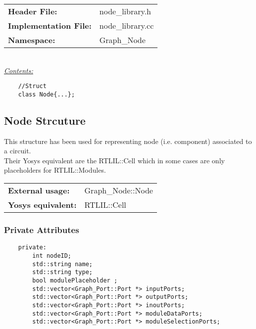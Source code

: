 \documentclass{article}
\begin{document}
\begin{tabular}{ll}
	\textbf{Header File:} & node\_library.h\\
	\textbf{Implementation File:} & node\_library.cc\\
	\textbf{Namespace: } & Graph\_Node\\
\end{tabular}\\

\underline{\textit{\underline{Contents: }}}\\

\begin{mdframed}[hidealllines=true, backgroundcolor=green!10]
	\begin{lstlisting}
	//Struct
	class Node{...};
	\end{lstlisting}
\end{mdframed}
\subsection{Node Strcuture}

This structure has been used for representing node (i.e. component) associated to a circuit.\\
Their Yosys equivalent are the RTLIL::Cell which in some cases are only placeholders for RTLIL::Modules.\\

\begin{tabular}{ll}
	\textbf{External usage: } & Graph\_Node::Node\\
	\textbf{Yosys equivalent: } & RTLIL::Cell \\
\end{tabular}

\subsubsection{Private Attributes}

\begin{mdframed}[hidealllines=true, backgroundcolor=magenta!10]
	\begin{lstlisting}
	private:
		int nodeID;
		std::string name;
		std::string type;
		bool modulePlaceholder ;
		std::vector<Graph_Port::Port *> inputPorts;
		std::vector<Graph_Port::Port *> outputPorts;
		std::vector<Graph_Port::Port *> inoutPorts;
		std::vector<Graph_Port::Port *> moduleDataPorts;
		std::vector<Graph_Port::Port *> moduleSelectionPorts;
	\end{lstlisting}
\end{mdframed}
\end{document}
